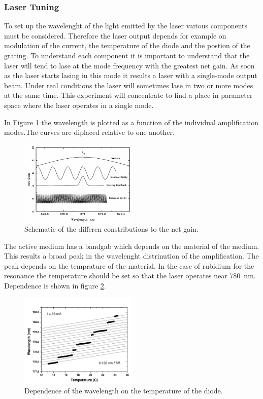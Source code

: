 \subsubsection{Laser Tuning}
\label{sec:Laser Tuning}

To set up the wavelenght of the light emitted by the laser various components must be considered.
Therefore the laser output depends for example on modulation of the current, the temperature of the diode and the postion of the grating.
To understand each component it is important to understand that the laser will tend to lase at the mode frequency with the greatest net gain.
As soon as the laser starts lasing in this mode it results a laser with a single-mode output beam. Under real conditions the laser will sometimes lase 
in two or more modes at the same time. This experiment will concentrate to find a place in parameter space where the laser operates in a single mode.

In Figure \ref{fig:netgain} the wavelength is plotted as a function of the individual amplification modes.The curves are diplaced relative
to one another.

\begin{figure}[H]
    \centering
    \includegraphics[width=0.5\textwidth]{content/graphics/net_gain_components.jpg}
    \caption{Schematic of the differen constributions to the net gain.} %
    \label{fig:netgain}
\end{figure}

The active medium has a bandgab which depends on the material of the medium. This results a broad peak in the wavelenght distrinution of the amplification.
The peak depends on the temprature of the material. In the case of rubidium for the resonance the temperature should be set so that the laser operates near 
\qty{780}{\nano\meter}.
Dependence is shown in figure \ref{fig:temp}.

\begin{figure}[H]
    \centering
    \includegraphics[width=0.5\textwidth]{content/graphics/wavelenghttotemperature.jpg}
    \caption{Dependence of the wavelength on the temperature of the diode.} %
    \label{fig:temp}
\end{figure}

